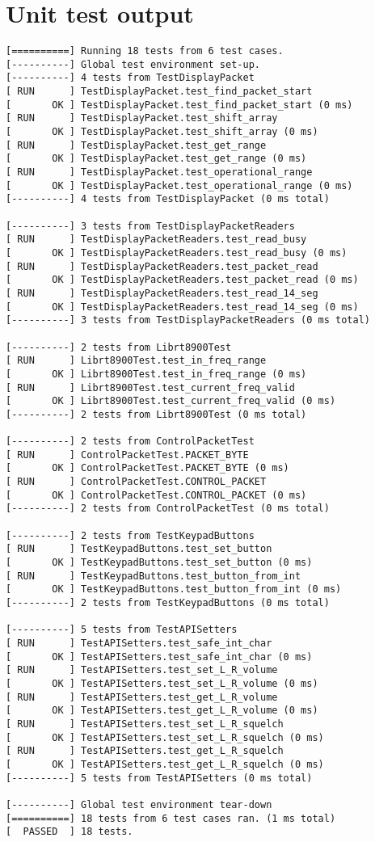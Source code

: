 \section{Unit test output}
\label{unit_test_output}
\begin{verbatim}
[==========] Running 18 tests from 6 test cases.
[----------] Global test environment set-up.
[----------] 4 tests from TestDisplayPacket
[ RUN      ] TestDisplayPacket.test_find_packet_start
[       OK ] TestDisplayPacket.test_find_packet_start (0 ms)
[ RUN      ] TestDisplayPacket.test_shift_array
[       OK ] TestDisplayPacket.test_shift_array (0 ms)
[ RUN      ] TestDisplayPacket.test_get_range
[       OK ] TestDisplayPacket.test_get_range (0 ms)
[ RUN      ] TestDisplayPacket.test_operational_range
[       OK ] TestDisplayPacket.test_operational_range (0 ms)
[----------] 4 tests from TestDisplayPacket (0 ms total)

[----------] 3 tests from TestDisplayPacketReaders
[ RUN      ] TestDisplayPacketReaders.test_read_busy
[       OK ] TestDisplayPacketReaders.test_read_busy (0 ms)
[ RUN      ] TestDisplayPacketReaders.test_packet_read
[       OK ] TestDisplayPacketReaders.test_packet_read (0 ms)
[ RUN      ] TestDisplayPacketReaders.test_read_14_seg
[       OK ] TestDisplayPacketReaders.test_read_14_seg (0 ms)
[----------] 3 tests from TestDisplayPacketReaders (0 ms total)

[----------] 2 tests from Librt8900Test
[ RUN      ] Librt8900Test.test_in_freq_range
[       OK ] Librt8900Test.test_in_freq_range (0 ms)
[ RUN      ] Librt8900Test.test_current_freq_valid
[       OK ] Librt8900Test.test_current_freq_valid (0 ms)
[----------] 2 tests from Librt8900Test (0 ms total)

[----------] 2 tests from ControlPacketTest
[ RUN      ] ControlPacketTest.PACKET_BYTE
[       OK ] ControlPacketTest.PACKET_BYTE (0 ms)
[ RUN      ] ControlPacketTest.CONTROL_PACKET
[       OK ] ControlPacketTest.CONTROL_PACKET (0 ms)
[----------] 2 tests from ControlPacketTest (0 ms total)

[----------] 2 tests from TestKeypadButtons
[ RUN      ] TestKeypadButtons.test_set_button
[       OK ] TestKeypadButtons.test_set_button (0 ms)
[ RUN      ] TestKeypadButtons.test_button_from_int
[       OK ] TestKeypadButtons.test_button_from_int (0 ms)
[----------] 2 tests from TestKeypadButtons (0 ms total)

[----------] 5 tests from TestAPISetters
[ RUN      ] TestAPISetters.test_safe_int_char
[       OK ] TestAPISetters.test_safe_int_char (0 ms)
[ RUN      ] TestAPISetters.test_set_L_R_volume
[       OK ] TestAPISetters.test_set_L_R_volume (0 ms)
[ RUN      ] TestAPISetters.test_get_L_R_volume
[       OK ] TestAPISetters.test_get_L_R_volume (0 ms)
[ RUN      ] TestAPISetters.test_set_L_R_squelch
[       OK ] TestAPISetters.test_set_L_R_squelch (0 ms)
[ RUN      ] TestAPISetters.test_get_L_R_squelch
[       OK ] TestAPISetters.test_get_L_R_squelch (0 ms)
[----------] 5 tests from TestAPISetters (0 ms total)

[----------] Global test environment tear-down
[==========] 18 tests from 6 test cases ran. (1 ms total)
[  PASSED  ] 18 tests.

\end{verbatim}